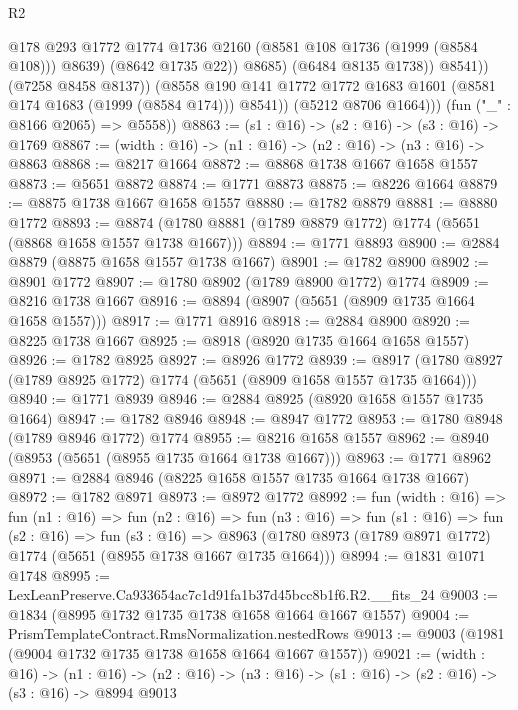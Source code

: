 \begin{lexlean}{R2}
\begin{coremodule}
                          @178
                          @293
                          @1772
                          @1774
                          @1736
                          @2160
                          (@8581 @108 @1736 (@1999 (@8584 @108)))
                          @8639)
                        (@8642 @1735 @22))
                      @8685)
                    (@6484 @8135 @1738))
                  @8541))
              (@7258 @8458 @8137))
            (@8558 @190 @141 @1772 @1772 @1683 @1601 (@8581 @174 @1683 (@1999 (@8584 @174))) @8541))
          (@5212 @8706 @1664)))
      (fun ("_" : @8166 @2065) => @5558))
@8863 := (s1 : @16) -> (s2 : @16) -> (s3 : @16) -> @1769
@8867 := (width : @16) -> (n1 : @16) -> (n2 : @16) -> (n3 : @16) -> @8863
@8868 := @8217 @1664
@8872 := @8868 @1738 @1667 @1658 @1557
@8873 := @5651 @8872
@8874 := @1771 @8873
@8875 := @8226 @1664
@8879 := @8875 @1738 @1667 @1658 @1557
@8880 := @1782 @8879
@8881 := @8880 @1772
@8893 := @8874 (@1780 @8881 (@1789 @8879 @1772) @1774 (@5651 (@8868 @1658 @1557 @1738 @1667)))
@8894 := @1771 @8893
@8900 := @2884 @8879 (@8875 @1658 @1557 @1738 @1667)
@8901 := @1782 @8900
@8902 := @8901 @1772
@8907 := @1780 @8902 (@1789 @8900 @1772) @1774
@8909 := @8216 @1738 @1667
@8916 := @8894 (@8907 (@5651 (@8909 @1735 @1664 @1658 @1557)))
@8917 := @1771 @8916
@8918 := @2884 @8900
@8920 := @8225 @1738 @1667
@8925 := @8918 (@8920 @1735 @1664 @1658 @1557)
@8926 := @1782 @8925
@8927 := @8926 @1772
@8939 := @8917 (@1780 @8927 (@1789 @8925 @1772) @1774 (@5651 (@8909 @1658 @1557 @1735 @1664)))
@8940 := @1771 @8939
@8946 := @2884 @8925 (@8920 @1658 @1557 @1735 @1664)
@8947 := @1782 @8946
@8948 := @8947 @1772
@8953 := @1780 @8948 (@1789 @8946 @1772) @1774
@8955 := @8216 @1658 @1557
@8962 := @8940 (@8953 (@5651 (@8955 @1735 @1664 @1738 @1667)))
@8963 := @1771 @8962
@8971 := @2884 @8946 (@8225 @1658 @1557 @1735 @1664 @1738 @1667)
@8972 := @1782 @8971
@8973 := @8972 @1772
@8992 := fun (width : @16) =>
  fun (n1 : @16) =>
  fun (n2 : @16) =>
  fun (n3 : @16) =>
  fun (s1 : @16) =>
  fun (s2 : @16) =>
  fun (s3 : @16) =>
  @8963 (@1780 @8973 (@1789 @8971 @1772) @1774 (@5651 (@8955 @1738 @1667 @1735 @1664)))
@8994 := @1831 @1071 @1748
@8995 := LexLeanPreserve.Ca933654ac7c1d91fa1b37d45bcc8b1f6.R2.__fits_24
@9003 := @1834 (@8995 @1732 @1735 @1738 @1658 @1664 @1667 @1557)
@9004 := PrismTemplateContract.RmsNormalization.nestedRows
@9013 := @9003 (@1981 (@9004 @1732 @1735 @1738 @1658 @1664 @1667 @1557))
@9021 := (width : @16) ->
  (n1 : @16) -> (n2 : @16) -> (n3 : @16) -> (s1 : @16) -> (s2 : @16) -> (s3 : @16) -> @8994 @9013

\end{coremodule}
\end{lexlean}

